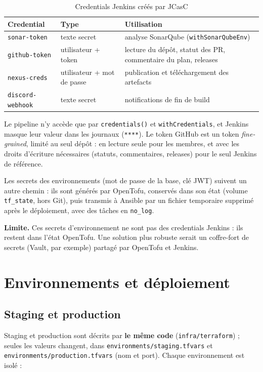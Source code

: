 \documentclass[11pt,a4paper]{report}
\begin{document}
\begin{table}[H]
  \centering
  \small
  \begin{tabularx}{\textwidth}{@{}L{3.2cm}L{3.2cm}Y@{}}
    \toprule
    \textbf{Credential} & \textbf{Type} & \textbf{Utilisation} \\
    \midrule
    \texttt{sonar-token} & texte secret & analyse SonarQube (\texttt{withSonarQubeEnv}) \\
    \texttt{github-token} & utilisateur + token & lecture du dépôt, statut des PR, commentaire du plan, releases \\
    \texttt{nexus-creds} & utilisateur + mot de passe & publication et téléchargement des artefacts \\
    \texttt{discord-webhook} & texte secret & notifications de fin de build \\
    \bottomrule
  \end{tabularx}
  \caption{Credentials Jenkins créés par JCasC}
\end{table}

Le pipeline n'y accède que par \texttt{credentials()} et \texttt{withCredentials}, et Jenkins masque leur valeur dans les journaux (\texttt{****}). Le token GitHub est un token \emph{fine-grained}, limité au seul dépôt : en lecture seule pour les membres, et avec les droits d'écriture nécessaires (statuts, commentaires, releases) pour le seul Jenkins de référence.

Les secrets des environnements (mot de passe de la base, clé JWT) suivent un autre chemin : ils sont générés par OpenTofu, conservés dans son état (volume \texttt{tf\_state}, hors Git), puis transmis à Ansible par un fichier temporaire supprimé après le déploiement, avec des tâches en \texttt{no\_log}.

\textbf{Limite.} Ces secrets d'environnement ne sont pas des credentials Jenkins : ils restent dans l'état OpenTofu. Une solution plus robuste serait un coffre-fort de secrets (Vault, par exemple) partagé par OpenTofu et Jenkins.

\chapter{Environnements et déploiement}\label{chap:deploiement}

\section{Staging et production}
Staging et production sont décrits par \textbf{le même code} (\texttt{infra/terraform}) ; seules les valeurs changent, dans \texttt{environments/staging.tfvars} et \texttt{environments/production.tfvars} (nom et port). Chaque environnement est isolé :
\end{document}
